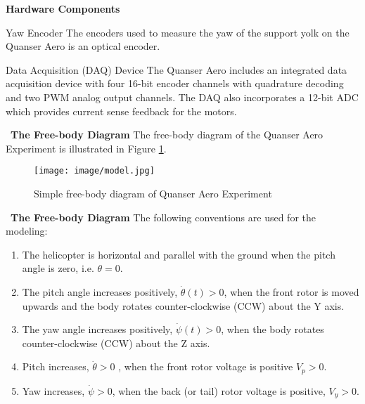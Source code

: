 \documentclass[blue,mathserif,envcountsect,compress,10pt,xcolor=pdftex,dvipsnames,table]{beamer}
\begin{document}
\begin{frame}{\SquareShadowTopLeft \bf Hardware Components}
\begin{block}{Yaw Encoder}
The encoders used to measure the yaw of the support yolk on the Quanser Aero is an optical encoder.
\end{block}

\begin{block}{Data Acquisition (DAQ) Device}
The Quanser Aero includes an integrated data acquisition device with four 16-bit encoder channels with quadrature decoding and two PWM analog output channels. The DAQ also incorporates a 12-bit ADC which provides current sense feedback for the motors.
\end{block}
\end{frame}


\begin{frame}{\SquareShadowTopLeft~\bf The Free-body Diagram}
The free-body diagram of the Quanser Aero Experiment is illustrated in Figure \ref{model}.

\begin{figure}
  \centering
  \texttt{[image: image/model.jpg]}
  \caption{Simple free-body diagram of Quanser Aero Experiment}\label{model}
\end{figure}
\end{frame}


\begin{frame}{\SquareShadowTopLeft~\bf The Free-body Diagram}
The following conventions are used for the modeling:
\begin{enumerate}
  \item The helicopter is horizontal and parallel with the ground when the pitch angle is zero, i.e. $\theta = 0$.
  \item The pitch angle increases positively, $\dot{\theta}(t) > 0$, when the front rotor is moved upwards and the body rotates counter-clockwise (CCW) about the Y axis.
  \item The yaw angle increases positively, $\dot{\psi}(t) > 0$, when the body rotates counter-clockwise (CCW) about the Z axis.
  \item Pitch increases, $\dot{\theta} > 0$ , when the front rotor voltage is positive $V_{p} > 0 $.
  \item Yaw increases, $\dot{\psi} > 0$, when the back (or tail) rotor voltage is positive, $V_{y} > 0$.
\end{enumerate}
\end{frame}
\end{document}
